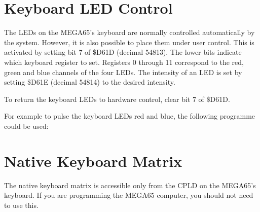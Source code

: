 \section{Keyboard LED Control}

The LEDs on the MEGA65's keyboard are normally controlled automatically
by the system.  However, it is also possible to place them under
user control.  This is activated by setting bit 7 of \$D61D (decimal 54813).
The lower bits indicate which keyboard register to set.  Registers 0 through 11
correspond to the red, green and blue channels of the four LEDs.  The intensity
of an LED is set by setting \$D61E (decimal 54814) to the desired intensity.

To return the keyboard LEDs to hardware control, clear bit 7 of \$D61D.

For example to pulse the keyboard LEDs red and blue, the following programme
could be used:

\begin{tcolorbox}[colback=black,coltext=white]

\end{tcolorbox}

\section{Native Keyboard Matrix}

The native keyboard matrix is accessible only from the CPLD on the MEGA65's keyboard.
If you are programming the MEGA65 computer, you should not need to use this.

